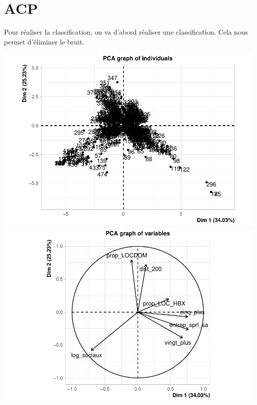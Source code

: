 \documentclass[
]{book}
\newenvironment{Shaded}{\begin{snugshade}}{\end{snugshade}}
\newcommand{\AttributeTok}[1]{\textcolor[rgb]{0.13,0.29,0.53}{#1}}
\newcommand{\ConstantTok}[1]{\textcolor[rgb]{0.56,0.35,0.01}{#1}}
\newcommand{\DecValTok}[1]{\textcolor[rgb]{0.00,0.00,0.81}{#1}}
\newcommand{\FunctionTok}[1]{\textcolor[rgb]{0.13,0.29,0.53}{\textbf{#1}}}
\newcommand{\NormalTok}[1]{#1}
\newcommand{\OtherTok}[1]{\textcolor[rgb]{0.56,0.35,0.01}{#1}}
\newcommand{\SpecialCharTok}[1]{\textcolor[rgb]{0.81,0.36,0.00}{\textbf{#1}}}
\begin{document}
\hypertarget{acp}{%
\section{ACP}\label{acp}}

Pour réaliser la classification, on va d'abord réaliser une classification. Cela nous permet d'éliminer le bruit.

\begin{Shaded}
\end{Shaded}

\includegraphics{bookdown-demo_files/figure-latex/unnamed-chunk-90-1.pdf} \includegraphics{bookdown-demo_files/figure-latex/unnamed-chunk-90-2.pdf}
\end{document}
